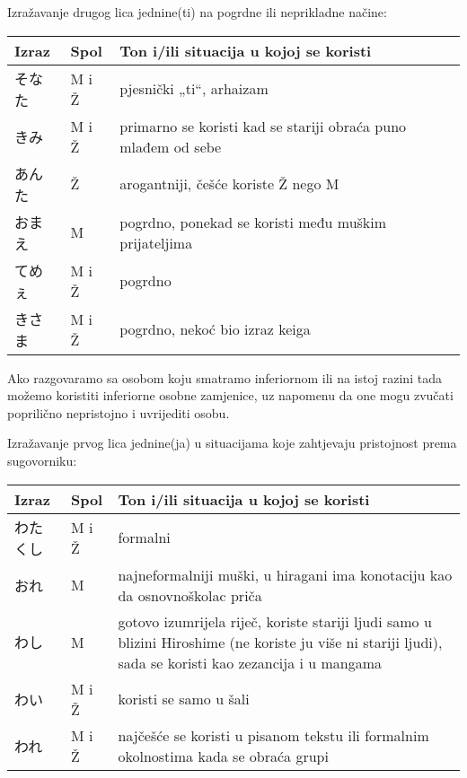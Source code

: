 	\begin{reibun}
	\end{reibun}

	Izražavanje drugog lica jednine(ti) na pogrdne ili neprikladne načine: 
	\begin{table}[!h]
	\begin{tabular}{l l l}
		\toprule[2pt]
		Izraz 			&Spol	&Ton i/ili situacija u kojoj se koristi\\ 
		\midrule
		そなた			&M i Ž	&pjesnički „ti“, arhaizam\\
		きみ\footnotemark[2]	&M i Ž	&primarno se koristi kad se stariji obraća puno mlađem od sebe\\
		あんた			&Ž	&arogantniji, češće koriste Ž nego M\\
		おまえ			&M	&pogrdno, ponekad se koristi među muškim prijateljima\\
		てめぇ			&M i Ž 	&pogrdno\\
		きさま			&M i Ž 	&pogrdno, nekoć bio izraz keiga\footnotemark[3]\\
		\bottomrule[2pt]
	\end{tabular}
	\end{table}
	
	
		Ako razgovaramo sa osobom koju smatramo inferiornom ili na istoj razini tada možemo koristiti inferiorne osobne zamjenice, uz napomenu da one mogu zvučati poprilično nepristojno i uvrijediti osobu.
		
	Izražavanje prvog lica jednine(ja) u situacijama koje zahtjevaju pristojnost prema sugovorniku: 
	\begin{table}[!h]	
	\begin{tabular}{l l p{400pt}}
		\toprule[2pt]
		Izraz		&Spol	&Ton i/ili situacija u kojoj se koristi\\
		\midrule
		わたくし	&M i Ž	&formalni\\
		おれ		&M	&najneformalniji muški, u hiragani ima konotaciju kao da osnovnoškolac priča\\
		わし		&M	&gotovo izumrijela riječ, koriste stariji ljudi samo u blizini Hiroshime (ne koriste ju više ni stariji ljudi), sada se koristi kao zezancija i u mangama\\
		わい		&M i Ž 	&koristi se samo u šali\\
		われ		&M i Ž	&najčešće se koristi u pisanom tekstu ili formalnim okolnostima kada se obraća grupi\\
		\bottomrule[2pt]
	\end{tabular}
	\end{table}

